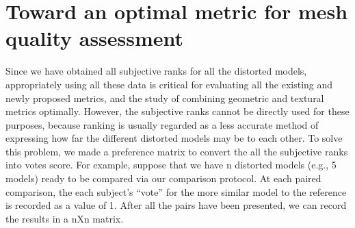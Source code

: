 \section{Toward an optimal metric for mesh quality assessment}
Since we have obtained all subjective ranks for all the distorted models, appropriately using all these data is critical for evaluating all the existing and newly proposed metrics, and the study of combining geometric and textural metrics optimally. However, the subjective ranks cannot be directly used for these purposes, because ranking is usually regarded as a less accurate method of expressing how far the different distorted models may be to each other.  To solve this problem, we made a preference matrix \cite{Ledda_2005} to convert the all the subjective ranks into votes score. For example, suppose that we have n distorted models (e.g., 5 models) ready to be compared via our comparison protocol.   At each paired comparison, the each subject’s “vote” for the more similar model to the reference is recorded as a value of 1. After all the pairs have been presented, we can record the results in a nXn matrix.